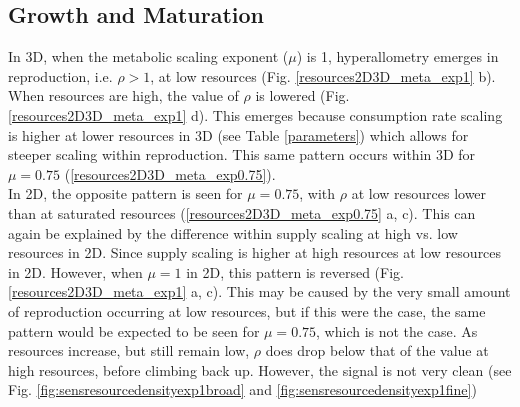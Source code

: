 \documentclass[a4paper, 11pt, hidelinks]{article} %
\begin{document}
	\subsection{Growth and Maturation}
	In 3D, when the metabolic scaling exponent ($ \mu $) is 1, hyperallometry emerges in reproduction, i.e. $ \rho > 1 $, at low resources (Fig. \ref{resources2D3D_meta_exp1} b).  When resources are high, the value of $ \rho $ is lowered (Fig. \ref{resources2D3D_meta_exp1} d).  This emerges because consumption rate scaling is higher at lower resources in 3D (see Table \ref{parameters}) which allows for steeper scaling within reproduction.  This same pattern occurs within 3D for $ \mu = 0.75$ (\ref{resources2D3D_meta_exp0.75}).  
	\\
	In 2D, the opposite pattern is seen for $ \mu = 0.75 $, with $ \rho $ at low resources lower than at saturated resources (\ref{resources2D3D_meta_exp0.75} a, c).  This can again be explained by the difference within supply scaling at high vs. low resources in 2D.  Since supply scaling is higher at high resources at low resources in 2D.  However, when $ \mu = 1 $ in 2D, this pattern is reversed (Fig. \ref{resources2D3D_meta_exp1} a, c).  This may be caused by the very small amount of reproduction occurring at low resources, but if this were the case, the same pattern would be expected to be seen for $ \mu = 0.75 $, which is not the case.  As resources increase, but still remain low, $ \rho $ does drop below that of the value at high resources, before climbing back up.  However, the signal is not very clean (see Fig. \ref{fig:sensresourcedensityexp1broad} and \ref{fig:sensresourcedensityexp1fine})
	
	
\end{document}
